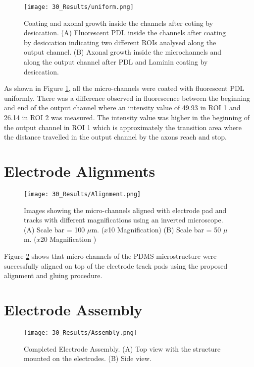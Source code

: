 \begin{figure}[H]
\centering
\texttt{[image: 30\_Results/uniform.png]}
\caption{Coating and axonal growth inside the channels after coting by desiccation. (A) Fluorescent PDL inside the channels after coating by desiccation indicating two different ROIs analysed along the output channel. (B) Axonal growth inside the microchannels and along the output channel after PDL and Laminin coating by desiccation.}
\label{fig:coatingByDessication}
\end{figure}

As shown in Figure \ref{fig:coatingByDessication}, all the micro-channels were coated with fluorescent PDL uniformly. There was a difference observed in fluorescence between the beginning and end of the output channel where an intensity value of 49.93 in ROI 1 and 26.14 in ROI 2 was measured. The intensity value was higher in the beginning of the output channel in ROI 1 which is approximately the transition area where the distance travelled in the output channel by the axons reach and stop.

\section{Electrode Alignments}

\begin{figure}[H]
\centering
\texttt{[image: 30\_Results/Alignment.png]}
\caption{Images showing the micro-channels aligned with electrode pad and tracks with different magnifications using an inverted microscope. (A) Scale bar = 100 $\mu$m. ($x$10 Magnification) (B) Scale bar = 50 $\mu$m. ($x$20 Magnification ) }
\label{fig:Alignment}
\end{figure}

Figure \ref{fig:Alignment} shows that micro-channels of the PDMS microstructure were successfully aligned on top of the electrode track pads using the proposed alignment and gluing procedure.


\section{Electrode Assembly}
\label{ch:Results}

\begin{figure}[H]
\centering
\texttt{[image: 30\_Results/Assembly.png]}
\caption{Completed Electrode Assembly. (A) Top view with the structure mounted on the electrodes. (B) Side view.}
\label{fig:Assembly}
\end{figure}

